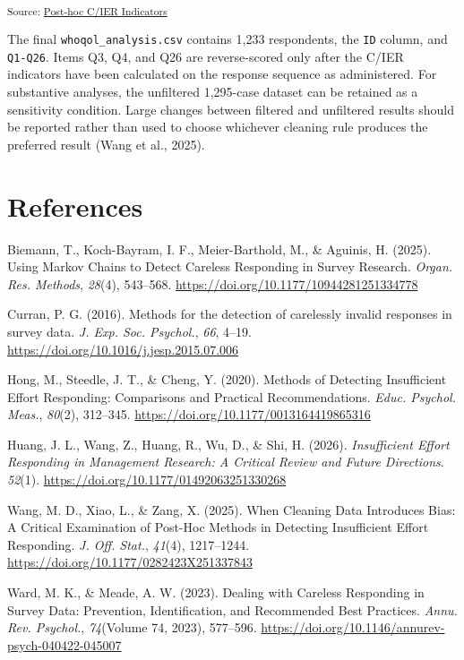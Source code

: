 \documentclass[
  letterpaper,
  DIV=11,
  numbers=noendperiod]{scrartcl}
\newlength{\cslhangindent}
\newenvironment{CSLReferences}[2] %
 {\begin{list}{}{%
  \setlength{\itemindent}{0pt}
  \setlength{\leftmargin}{0pt}
  \setlength{\parsep}{0pt}
  \ifodd #1
   \setlength{\leftmargin}{\cslhangindent}
   \setlength{\itemindent}{-1\cslhangindent}
  \fi
  \setlength{\itemsep}{#2\baselineskip}}}
 {\end{list}}
\begin{document}
\textsubscript{Source:
\href{https://phdpablo.github.io/cier/Scripts/ProcessingScripts/02_posthoc-preview.html\#cell-tbl-analysis-sample-summary}{Post-hoc
C/IER Indicators}}

The final \texttt{whoqol\_analysis.csv} contains 1,233 respondents, the
\texttt{ID} column, and \texttt{Q1-Q26}. Items Q3, Q4, and Q26 are
reverse-scored only after the C/IER indicators have been calculated on
the response sequence as administered. For substantive analyses, the
unfiltered 1,295-case dataset can be retained as a sensitivity
condition. Large changes between filtered and unfiltered results should
be reported rather than used to choose whichever cleaning rule produces
the preferred result (Wang et al., 2025).

\section*{References}\label{references}

\protect{}\label{refs}
\begin{CSLReferences}{1}{0}
Biemann, T., Koch-Bayram, I. F., Meier-Barthold, M., \& Aguinis, H.
(2025). Using {Markov Chains} to {Detect Careless Responding} in {Survey
Research}. \emph{Organ. Res. Methods}, \emph{28}(4), 543--568.
\url{https://doi.org/10.1177/10944281251334778}

Curran, P. G. (2016). Methods for the detection of carelessly invalid
responses in survey data. \emph{J. Exp. Soc. Psychol.}, \emph{66},
4--19. \url{https://doi.org/10.1016/j.jesp.2015.07.006}

Hong, M., Steedle, J. T., \& Cheng, Y. (2020). Methods of {Detecting
Insufficient Effort Responding}: {Comparisons} and {Practical
Recommendations}. \emph{Educ. Psychol. Meas.}, \emph{80}(2), 312--345.
\url{https://doi.org/10.1177/0013164419865316}

Huang, J. L., Wang, Z., Huang, R., Wu, D., \& Shi, H. (2026).
\emph{Insufficient {Effort Responding} in {Management Research}: {A
Critical Review} and {Future Directions}}. \emph{52}(1).
\url{https://doi.org/10.1177/01492063251330268}

Wang, M. D., Xiao, L., \& Zang, X. (2025). When {Cleaning Data
Introduces Bias}: {A Critical Examination} of {Post-Hoc Methods} in
{Detecting Insufficient Effort Responding}. \emph{J. Off. Stat.},
\emph{41}(4), 1217--1244.
\url{https://doi.org/10.1177/0282423X251337843}

Ward, M. K., \& Meade, A. W. (2023). Dealing with {Careless Responding}
in {Survey Data}: {Prevention}, {Identification}, and {Recommended Best
Practices}. \emph{Annu. Rev. Psychol.}, \emph{74}(Volume 74, 2023),
577--596. \url{https://doi.org/10.1146/annurev-psych-040422-045007}

\end{CSLReferences}
\end{document}
